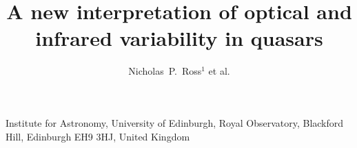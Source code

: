 \documentclass{nature}
\title{A new interpretation of optical and infrared variability in quasars}
\author{Nicholas~P.~Ross$^{1}$ et al.  
}
\begin{document}
\maketitle

\begin{affiliations}
  \item Institute for Astronomy, University of Edinburgh, Royal Observatory, Blackford Hill, Edinburgh EH9 3HJ, United Kingdom 
\end{affiliations}
\end{document}
